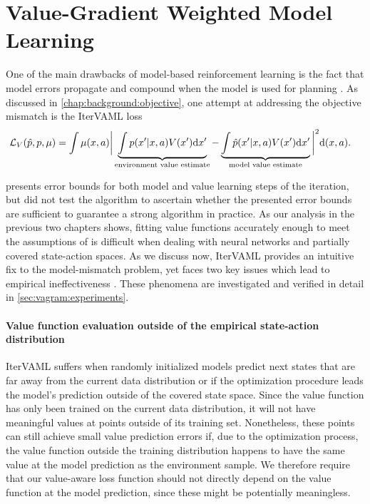 \section{Value-Gradient Weighted Model Learning}
\label{sec:vagram:method}

One of the main drawbacks of model-based reinforcement learning is the fact that model errors propagate and compound when the model is used for planning \parencite{schneider1997exploiting,kearns2002near,talvitie2017self}.
As discussed in \autoref{chap:background:objective}, one attempt at addressing the objective mismatch is the IterVAML loss \parencite{itervaml}
\begin{align}
    &\mathcal{L}_V(\hat{p}, p, \mu) = \int \mu(x,a) \bigg|\underbrace{\int p(x'|x,a)V(x')\mathrm{d}x'}_{\text{environment value estimate}}  - \underbrace{\int \hat{p}(x'|x,a) V(x') \mathrm{d}x'}_{\text{model value estimate}}\bigg|^2 \mathrm{d} (x,a).
\end{align}

\textcite{itervaml} presents error bounds for both model and value learning steps of the iteration, but did not test the algorithm to ascertain whether the presented error bounds are sufficient to guarantee {a strong algorithm in practice}. 
As our analysis in the previous two chapters shows, fitting value functions accurately enough to meet the assumptions of \textcite{itervaml} is difficult when dealing with neural networks and partially covered state-action spaces.
As we discuss now, IterVAML provides an intuitive fix to the model-mismatch problem, yet faces two key issues which lead to empirical ineffectiveness \textcite{lovatto2020decision}. 
These phenomena are investigated and verified in detail in \autoref{sec:vagram:experiments}.

\paragraph{Value function evaluation outside of the empirical state-action distribution} IterVAML suffers when randomly initialized models predict next states that are far away from the current data distribution or if the optimization procedure leads the model's prediction outside of the covered state space. 
Since the value function has only been trained on the current data distribution, it will not have meaningful values at points outside of its training set.
Nonetheless, these points can still achieve small value prediction errors if, due to the optimization process, the value function outside the training distribution happens to have the same value at the model prediction as the environment sample.
We therefore require that our value-aware loss function should not directly depend on the value function at the model prediction, since these might be potentially meaningless.

